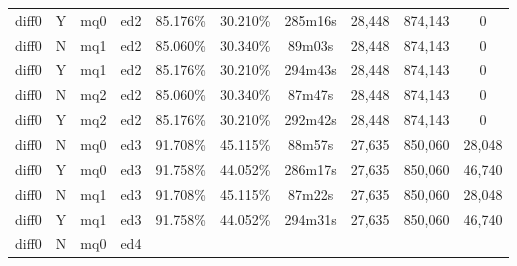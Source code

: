 \begin{sidewaystable}[!tp]
\begin{center}
\begin{tabular}{|c|c|c|c||c|c||c|c|c|c|}
diff0 & Y & mq0 & ed2
	& 85.176\% & 30.210\%
	& 285m16s & 28,448
	& 874,143 & 0 \\
diff0 & N & mq1 & ed2
	& 85.060\% & 30.340\%
	& 89m03s & 28,448
	& 874,143 & 0 \\
diff0 & Y & mq1 & ed2
	& 85.176\% & 30.210\%
	& 294m43s & 28,448
	& 874,143 & 0 \\
diff0 & N & mq2 & ed2
	& 85.060\% & 30.340\%
	& 87m47s & 28,448
	& 874,143 & 0 \\
diff0 & Y & mq2 & ed2
	& 85.176\% & 30.210\%
	& 292m42s & 28,448
	& 874,143 & 0 \\
% 
% 
diff0 & N & mq0 & ed3
	& 91.708\% & 45.115\%
	& 88m57s & 27,635
	& 850,060 & 28,048 \\
diff0 & Y & mq0 & ed3
	& 91.758\% & 44.052\%
	& 286m17s & 27,635
	& 850,060 & 46,740 \\
diff0 & N & mq1 & ed3
	& 91.708\% & 45.115\%
	& 87m22s & 27,635
	& 850,060 & 28,048 \\
diff0 & Y & mq1 & ed3
	& 91.758\% & 44.052\%
	& 294m31s & 27,635
	& 850,060 & 46,740 \\
diff0 & N & mq0 & ed4

\end{tabular}
\end{center}
\end{sidewaystable}

